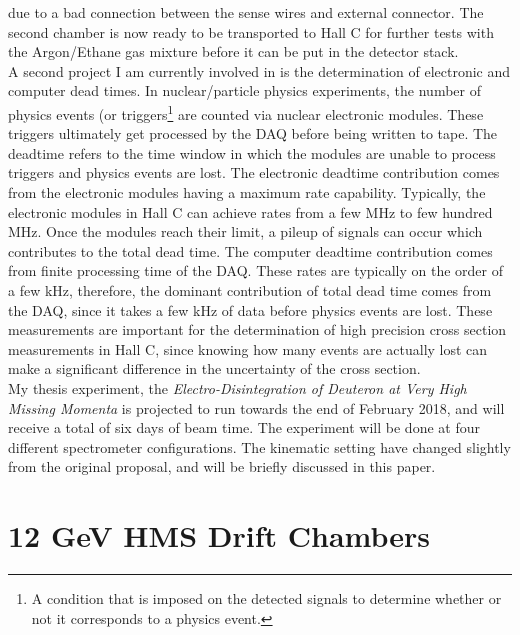 \documentclass[letterpaper, 12 pt, conference]{ieeeconf}  %
\begin{document}
due to a bad connection between the sense wires and external connector. The second chamber is now ready to be transported to Hall C for further tests with the
Argon/Ethane gas mixture before it can be put in the detector stack.\\
\indent A second project I am currently involved in is the determination of electronic and computer dead times. In nuclear/particle physics experiments,
the number of physics events (or triggers\footnote{A condition that is imposed on the detected signals to determine whether or not it corresponds to a physics event.}  are counted via nuclear electronic modules. These triggers ultimately get processed by the DAQ before being
written to tape. The deadtime refers to the time window in which the modules are unable to process triggers and physics events are lost.
The electronic deadtime contribution comes from the electronic modules having a maximum rate capability. Typically,
the electronic modules in Hall C can achieve rates from a few MHz to few hundred MHz. Once the modules reach their limit, a pileup of signals can occur which
contributes to the total dead time. The computer deadtime contribution comes from finite processing time of the DAQ. These rates are typically on the order of
a few kHz, therefore, the dominant contribution of total dead time comes from the DAQ, since it takes a few kHz of data before physics events
are lost. These measurements are important for the determination of high precision cross section measurements in Hall C, since knowing how many events
are actually lost can make a significant difference in the uncertainty of the cross section. \\
\indent My thesis experiment, the \textit{Electro-Disintegration of Deuteron at Very High Missing Momenta} is projected to run towards the end of
February 2018, and will receive a total of six days of beam time. The experiment will be done at four different spectrometer configurations. The kinematic
setting have changed slightly from the original proposal, and will be briefly discussed in this paper. 


\section{12 GeV HMS Drift Chambers}
\end{document}
